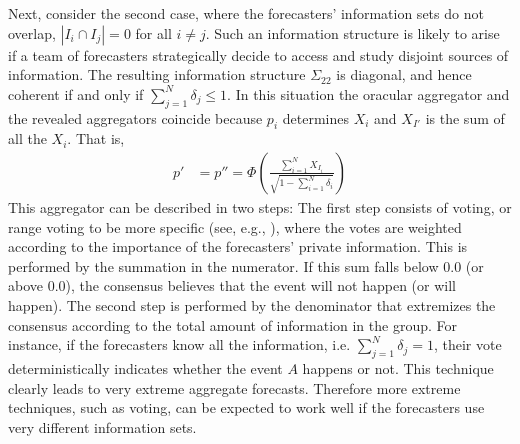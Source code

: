 \documentclass[11pt]{article}
\theoremstyle{definition}
\theoremstyle{definition}
\begin{document}
Next, consider the second case, where the forecasters' information sets do not overlap,  $|I_{i} \cap I_{j}| = 0$ for all $i \neq j$. Such an information structure is likely to arise if a team of forecasters strategically decide to access and study disjoint sources of information. The resulting information structure $\Sigma_{22}$ 
is diagonal, and hence coherent if and only if $\sum_{j=1}^N \delta_j \leq 1$. 
In this situation the oracular aggregator and the revealed aggregators
coincide because $p_i$ determines $X_i$ and $X_{I'}$ is the sum of
all the $X_i$. That is,
 \begin{align*}
p' &= p'' =  \Phi\left( \frac{\sum_{i=1}^N X_{I_i}}
  {\sqrt{1- \sum_{i=1}^N \delta_i}} \right) 
\end{align*}
This aggregator can be described in two steps: The first step consists of voting, or range voting to be more specific (see, e.g., \citealt{fishkin1997voice}), where the votes are weighted according to the importance of the forecasters' private information. This is performed by the summation in the numerator. If this sum falls below $0.0$ (or above $0.0$), the consensus believes that the event will not happen (or will happen). The second step is performed by the denominator that extremizes the  consensus according to the total amount of information in the group. For instance, if the forecasters know all the information, i.e. $\sum_{j=1}^N \delta_j = 1$, their vote deterministically indicates whether the event $A$ happens or not. This technique clearly leads to very extreme aggregate forecasts. Therefore more extreme techniques, such as voting, can be expected to work well if the forecasters use very different information sets.
\end{document}
